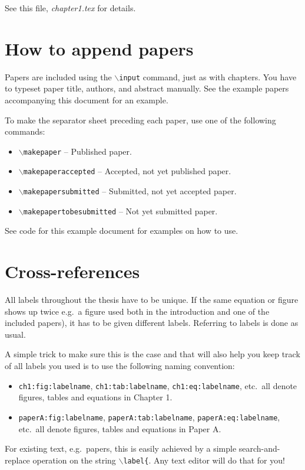 See this file, \textit{chapter1.tex} for details.

\section{How to append papers}
Papers are included using the \texttt{$\backslash$input} command, just as with chapters. You have to typeset paper title, authors, and abstract manually. See the example papers accompanying this document for an example.

To make the separator sheet preceding each paper, use one of the following commands:
\begin{itemize}
	\item \texttt{$\backslash$makepaper} -- Published paper.
	\item \texttt{$\backslash$makepaperaccepted} -- Accepted, not yet published paper.
	\item \texttt{$\backslash$makepapersubmitted} -- Submitted, not yet accepted paper.
	\item \texttt{$\backslash$makepapertobesubmitted} -- Not yet submitted paper.
\end{itemize}

See code for this example document for examples on how to use.

\section{Cross-references}
All labels throughout the thesis have to be unique. If the same
equation or figure shows up twice e.g.\ a figure used
both in the introduction and one of the included papers), it has
to be given different labels. Referring to labels is done as
usual.

A simple trick to make sure this is the case and that will also help you keep track of all labels you used is to use the following naming convention:
\begin{itemize}
	\item \texttt{ch1:fig:labelname}, \texttt{ch1:tab:labelname}, \texttt{ch1:eq:labelname}, etc.\ all denote figures, tables and equations in Chapter 1.
	\item \texttt{paperA:fig:labelname}, \texttt{paperA:tab:labelname}, \texttt{paperA:eq:labelname}, etc.\ all denote figures, tables and equations in Paper A.
\end{itemize}

For existing text, e.g.\ papers, this is easily achieved by a simple search-and-replace operation on the string \texttt{$\backslash$label\{}. Any text editor will do that for you!

